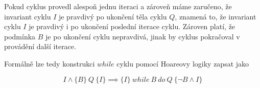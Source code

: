 Pokud cyklus provedl alespoň jednu iteraci a zároveň máme zaručeno,
že invariant cyklu $I$ je pravdivý po ukončení těla cyklu $Q$,
znamená to, že invariant cyklu $I$ je pravdivý i po ukončení poslední iterace cyklu.
Zároven platí, že podmínka $B$ je po ukončení cyklu nepravdivá, jinak by cyklus pokračoval v provádění další iterace.

Formálně lze tedy konstrukci $while$ cyklu pomocí Hoareovy logiky zapsat jako

\begin{equation*}
    I \land \{ B \} \  Q \  \{ I \} \implies \{ I \} \  while \  B \  do \  Q \  \{ \neg B \land I \}
\end{equation*}

